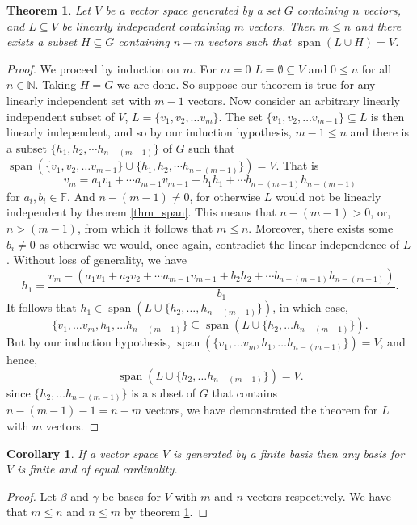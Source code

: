 \documentclass[oneside, 12pt]{book}
\DeclareMathOperator{\spn}{span}
\newtheorem{thm}{Theorem}[section]
\newtheorem{cor}{Corollary}[section]
\theoremstyle{definition}
\begin{document}
\begin{thm}
\label{thm_replace}
  Let $V$ be a vector space generated by a set $G$ containing $n$ vectors, and $L \subseteq V$ be linearly independent containing $m$ vectors. Then $m \leq n$
  and there exists a subset $H \subseteq G$ containing $n-m$ vectors such that $\spn(L \cup H)=V$.
\end{thm}
\begin{proof}
  We proceed by induction on $m$. For $m=0$ $L=\emptyset \subseteq V$ and $0 \leq n$ for all $n \in \mathbb{N}$. Taking $H=G$ we are done. So suppose our theorem is true for any linearly independent set with $m-1$ vectors. Now consider an arbitrary linearly independent subset of $V$, $L=\{v_{1}, v_{2}, \dots v_{m}\}$. The set $\{v_{1}, v_{2}, \dots v_{m-1}\} \subseteq L$ is then linearly independent, and so by our induction hypothesis, $m-1 \leq n$ and there is a subset $\{h_{1}, h_{2}, \cdots h_{n-(m-1)}\}$ of $G$ such that $\spn(\{v_{1}, v_{2}, \dots v_{m-1}\} \cup \{h_{1}, h_{2}, \cdots h_{n-(m-1)}\})=V$. That is
  \[v_{m}=a_{1}v_{1}+ \cdots a_{m-1}v_{m-1}+b_{1}h_{1}+ \cdots b_{n-(m-1)}h_{n-(m-1)}\]
  for $a_{i}, b_{i} \in \mathbb{F}$. And $n-(m-1)\neq0$, for otherwise $L$ would not be linearly independent by theorem \ref{thm_span}. This means that $n-(m-1)>0$, or, $n>(m-1)$, from which it follows that $m \leq n$. Moreover, there exists some $b_{i}\neq 0$ as otherwise we would, once again, contradict the linear independence of $L$. Without loss of generality, we have
  \[h_{1}=\frac{v_{m}-(a_{1}v_{1}+a_{2}v_{2}+\cdots a_{m-1}v_{m-1}+b_{2}h_{2}+\cdots b_{n-(m-1)}h_{n-(m-1)})}{b_{1}}.\]
  It follows that $h_{1} \in \spn(L \cup \{h_{2}, \dots, h_{n-(m-1)}\})$,  in which case,
  \[\{v_{1}, \dots v_{m}, h_{1}, \dots h_{n-(m-1)}\} \subseteq \spn(L \cup \{h_{2}, \dots h_{n-(m-1)}\}).\]
  But by our induction hypothesis, $\spn(\{v_{1}, \dots v_{m}, h_{1}, \dots h_{n-(m-1)}\})=V$, and hence,\[\spn(L \cup \{h_{2}, \dots h_{n-(m-1)}\})=V.\]
  since $\{h_{2}, \dots h_{n-(m-1)}\}$ is a subset of $G$ that contains $n-(m-1)-1=n-m$ vectors, we have demonstrated the theorem for $L$ with $m$ vectors.
\end{proof}
\begin{cor}
\label{thm_dim}
If a vector space $V$ is generated by a finite basis then any basis for $V$ is finite and of equal cardinality.
\end{cor}
\begin{proof}
Let $\beta$ and $\gamma$ be bases for $V$ with $m$ and $n$ vectors respectively. We have that $m \leq n$ and $n \leq m$ by theorem \ref{thm_replace}.
\end{proof}
\end{document}
